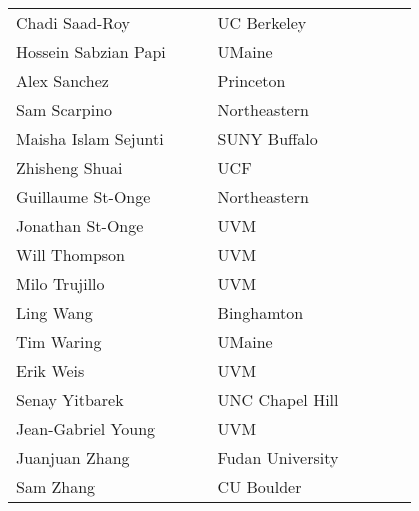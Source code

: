 \begin{center}
\begin{longtable}{p{0.4\linewidth} p{0.4\linewidth} }
    Chadi Saad-Roy & UC Berkeley \\ 
    Hossein Sabzian Papi & UMaine \\ 
    Alex Sanchez & Princeton \\ 
    Sam Scarpino & Northeastern \\ 
    Maisha Islam Sejunti & SUNY Buffalo \\ 
    Zhisheng Shuai & UCF \\ 
    Guillaume St-Onge & Northeastern \\ 
    Jonathan St-Onge & UVM \\ 
    Will Thompson & UVM \\ 
    Milo Trujillo & UVM \\ 
    Ling Wang & Binghamton \\ 
    Tim Waring & UMaine \\ 
    Erik Weis & UVM \\ 
    Senay Yitbarek & UNC Chapel Hill \\ 
    Jean-Gabriel Young & UVM \\ 
    Juanjuan Zhang & Fudan University \\ 
    Sam Zhang & CU Boulder \\ 
    \end{longtable}
    \end{center}